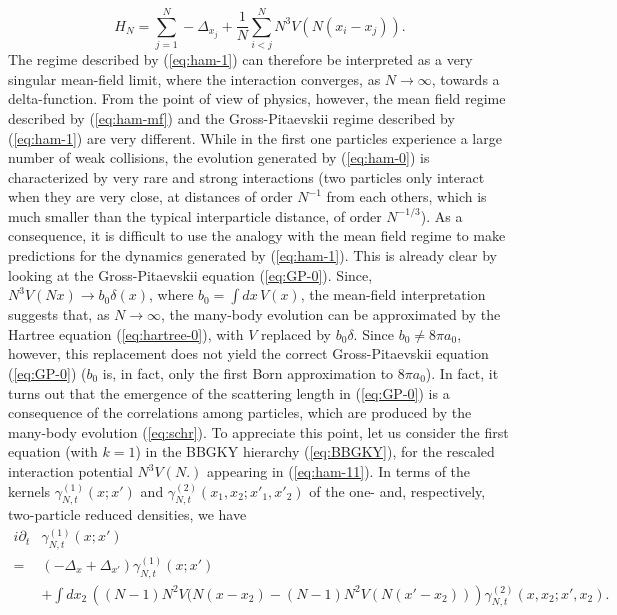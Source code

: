 \documentclass[11pt,a4paper]{article}
\begin{document}
\begin{equation}\label{eq:ham-11} H_N = \sum_{j=1}^N -\Delta_{x_j} +
\frac{1}{N} \sum_{i<j}^N N^3 V (N (x_i - x_j)). \end{equation}
The regime described by (\ref{eq:ham-1}) can therefore be interpreted as a very singular mean-field limit, where the interaction converges, as $N \to \infty$, towards a delta-function. 
{F}rom the point of view of physics, however, the mean field regime described by (\ref{eq:ham-mf}) and the Gross-Pitaevskii regime described by (\ref{eq:ham-1}) are very different. While in the first one particles experience a large number of weak collisions, the evolution generated by (\ref{eq:ham-0}) is characterized by very rare and strong interactions (two particles only interact when they are very close, at distances of order $N^{-1}$ from each others, which is much smaller than the typical interparticle distance, of order $N^{-1/3}$). As a consequence, it is difficult to use the analogy with the mean field regime to make predictions for the dynamics generated by (\ref{eq:ham-1}). This is already clear by looking at the Gross-Pitaevskii equation (\ref{eq:GP-0}). Since, $N^3 V(Nx) \to b_0 \delta (x)$, where $b_0 = \int dx\, V(x)$, the mean-field interpretation suggests that, as $N \to \infty$, the many-body evolution can be approximated by the Hartree equation (\ref{eq:hartree-0}), with $V$ replaced by $b_0 \delta$. Since $b_0 \not = 8 \pi a_0$, however, this replacement does not yield the correct Gross-Pitaevskii equation (\ref{eq:GP-0}) ($b_0$ is, in fact, only the first Born approximation to $8\pi a_0$). In fact, it turns out that the emergence of the scattering length in (\ref{eq:GP-0}) is a consequence of the correlations among particles, which are produced by the many-body evolution  (\ref{eq:schr}). To appreciate this point, let us consider the first equation (with $k=1$) in the BBGKY hierarchy (\ref{eq:BBGKY}), for the rescaled interaction potential $N^3 V (N.)$ appearing in (\ref{eq:ham-11}). In terms of the kernels $\gamma^{(1)}_{N,t} (x;x')$ and $\gamma^{(2)}_{N,t} (x_1, x_2 ; x'_1, x'_2)$ of the one- and, respectively, two-particle reduced densities, we have
\begin{equation}\label{eq:BBGKY1} \begin{split} 
i\partial_t & \gamma^{(1)}_{N,t} (x;x') \\ = \; & \left( -\Delta_x + \Delta_{x'} \right) \gamma^{(1)}_{N,t} (x;x')  
\\ &+ \int dx_2 \, \left( (N-1) N^2 V (N (x-x_2) - (N-1) N^2 V(N (x'-x_2))
\right) \gamma^{(2)}_{N,t} (x,x_2 ; x',x_2). \end{split} \end{equation}
\end{document}

